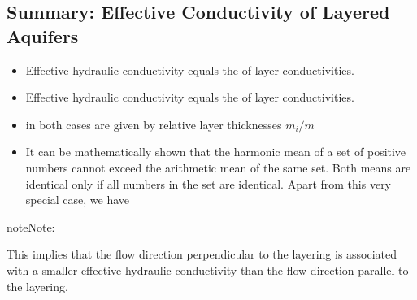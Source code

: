 \documentclass[letterpaper,10pt,english]{jupyterBook}
\begin{document}
\subsection{Summary: Effective Conductivity of Layered Aquifers}
\label{\detokenize{content/flow/L5/15_het_iso:summary-effective-conductivity-of-layered-aquifers}}\begin{itemize}
\item {} 
\sphinxAtStartPar
{} 
Effective hydraulic conductivity equals the  of layer conductivities.

\item {} 
\sphinxAtStartPar
{} 
Effective hydraulic conductivity equals the  of layer conductivities.

\item {} 
\sphinxAtStartPar
{} in both cases are given by relative layer thicknesses \(m_i/m\)

\item {} 
\sphinxAtStartPar
It can be mathematically shown that the harmonic mean of a set of
positive numbers cannot exceed the arithmetic mean of the same set. Both means are identical only if all numbers in the set are identical.
Apart from this very special case, we have

\end{itemize}

\begin{sphinxadmonition}{note}{Note:}\begin{quote}

\sphinxAtStartPar
{}
\end{quote}
\end{sphinxadmonition}

\sphinxAtStartPar
This implies that the flow direction perpendicular to the layering is associated with a smaller effective hydraulic conductivity than the flow direction parallel to the layering.
\end{document}
